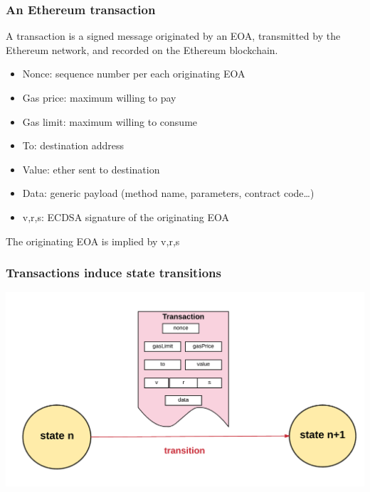 \documentclass[11pt]{beamer}  %
\begin{document}
\begin{frame}\frametitle{An Ethereum transaction}

  \begin{greenbox}{}
    A transaction is a signed message originated by an EOA, transmitted
    by the Ethereum network, and recorded on the Ethereum blockchain.
    \begin{itemize}
    \item Nonce: sequence number per each originating EOA
    \item Gas price: maximum willing to pay
    \item Gas limit: maximum willing to consume
    \item To: destination address
    \item Value: ether sent to destination
    \item Data: generic payload (method name, parameters, contract code\ldots)
    \item v,r,s: ECDSA signature of the originating EOA
    \end{itemize}
  \end{greenbox}

  \begin{center}
    The originating EOA is implied by v,r,s
  \end{center}

\end{frame}

\begin{frame}\frametitle{Transactions induce state transitions}

  \begin{center}
    \includegraphics[width=\textwidth,clip=false]{pictures/state-transition.png}
  \end{center}

\end{frame}
\end{document}
